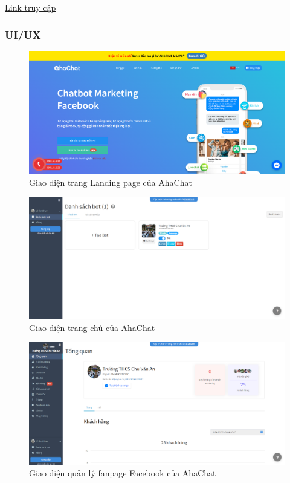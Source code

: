 \href{https://ahachat.com/}{Link truy cập}
\subsubsection{UI/UX}
\begin{figure}[H]
    \centering
    \includegraphics[width=1\linewidth]{Images/ahachatlanding.png}
    \vspace{0.5cm}
    \caption{Giao diện trang Landing page của AhaChat}
    \label{fig:enter-label}
\end{figure}
\begin{figure}[H]
    \centering
    \includegraphics[width=1\linewidth]{Images/homeahachat.png}
    \vspace{0.5cm}
    \caption{Giao diện trang chủ của AhaChat}
    \label{fig:enter-label}
\end{figure}
\begin{figure}[H]
    \centering
    \includegraphics[width=1\linewidth]{Images/quanlypageahachat.png}
    \vspace{0.5cm}
    \caption{Giao diện quản lý fanpage Facebook của AhaChat}
    \label{fig:enter-label}
\end{figure}
